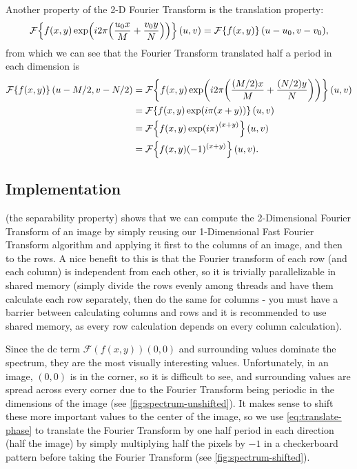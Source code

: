 \documentclass[headings=optiontoheadandtoc,listof=totoc,parskip=full]{scrartcl}
\begin{document}
Another property of the 2-D Fourier Transform is the translation property:
\begin{equation}
	\label{eq:translation}
	\mathcal{F}\qty{f(x,y)\exp(i2\pi\qty(\frac{u_0x}{M} + \frac{v_0y}{N}))}(u,v) = \mathcal{F}\qty{f(x,y)}(u - u_0,v - v_0),
\end{equation}
from which we can see that the Fourier Transform translated half a period in each dimension is
\begin{equation}
	\label{eq:translate-phase}
\begin{aligned}
		\mathcal{F}\qty{f(x,y)}(u - M/2,v - N/2) &= \mathcal{F}\qty{f(x,y)\exp(i2\pi\qty(\frac{(M / 2)x}{M} + \frac{(N / 2)y}{N}))}(u,v)\\
			&= \mathcal{F}\qty{f(x,y)\exp(i\pi\qty(x + y))}(u,v)\\
			&= \mathcal{F}\qty{f(x,y)\exp(i\pi)^{(x + y)}}(u,v)\\
			&= \mathcal{F}\qty{f(x,y)(-1)^{(x + y)}}(u,v).
\end{aligned}
\end{equation}

\subsection{Implementation}
 (the separability property) shows that we can compute the 2-Dimensional Fourier Transform of an image by simply reusing our 1-Dimensional Fast Fourier Transform algorithm and applying it first to the columns of an image, and then to the rows. A nice benefit to this is that the Fourier transform of each row (and each column) is independent from each other, so it is trivially parallelizable in shared memory (simply divide the rows evenly among threads and have them calculate each row separately, then do the same for columns - you must have a barrier between calculating columns and rows and it is recommended to use shared memory, as every row calculation depends on every column calculation).

Since the dc term $\mathcal{F}(f(x,y))(0,0)$ and surrounding values dominate the spectrum, they are the most visually interesting values. Unfortunately, in an image, $(0,0)$ is in the corner, so it is difficult to see, and surrounding values are spread across every corner due to the Fourier Transform being periodic in the dimensions of the image (see \cref{fig:spectrum-unshifted}). It makes sense to shift these more important values to the center of the image, so we use \cref{eq:translate-phase} to translate the Fourier Transform by one half period in each direction (half the image) by simply multiplying half the pixels by $-1$ in a checkerboard pattern before taking the Fourier Transform (see \cref{fig:spectrum-shifted}).
\end{document}

